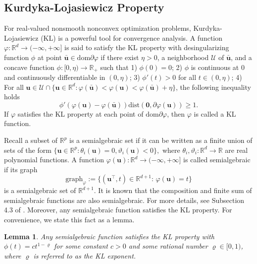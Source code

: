 \documentclass{article}
\newtheorem{lemma}[theorem]{Lemma}
\numberwithin{equation}{section}
\begin{document}
\subsection{Kurdyka-Lojasiewicz Property}
For real-valued nonsmooth nonconvex optimization problems, Kurdyka-Lojasiewicz (KL) is a powerful tool for convergence analysis. A function $\varphi: \mathbb{R}^d\to(-\infty, +\infty]$ is said to satisfy the KL property with desingularizing function $\phi$ at
point $\bar{\mathbf{u}}\in\mathrm{dom}\partial\varphi$ if there exist $\eta>0$, a neighborhood $\mathcal{U}$ of $\bar{\mathbf{u}}$,
and a concave function $\phi:[0,\eta)\to\mathbb{R}_{+}$ such that 1) $\phi(0)=0$; 2) $\phi$ is continuous at 0 and continuously differentiable in $(0, \eta)$; 3) $\phi'(t)>0$ for all $t\in(0, \eta)$; 4) For all $\mathbf{u}\in\mathcal{U}\cap\{\mathbf{u}\in\mathbb{R}^d: \varphi(\bar{\mathbf{u}})<\varphi(\mathbf{u})<
	\varphi(\bar{\mathbf{u}})+\eta\}$, the following inequality holds
	\[
	\phi'(\varphi(\mathbf{u})-\varphi(\bar{\mathbf{u}}))\mathrm{dist}(\mathbf{0}, \partial\varphi(\mathbf{u}))\geq 1.
	\]
If $\varphi$ satisfies the KL property at each point of $\mathrm{dom}\partial\varphi$, then $\varphi$ is called a KL function.


Recall a subset of $\mathbb{R}^p$ is a  semialgebraic set if it  can  be written as a finite union of sets of the form
$\{\mathbf{u}\in\mathbb{R}^p: \theta_i(\mathbf{u})=0, \vartheta_i(\mathbf{u})<0\},$
where $\theta_i, \vartheta_i: \mathbb{R}^d\to\mathbb{R}$ are real polynomial functions. A function $\varphi(\mathbf{u}): \mathbb{R}^d\to(-\infty, +\infty]$ is called  semialgebraic if its graph
$$\mathrm{graph}_{\varphi}:=\{(\mathbf{u}^\top, t)\in\mathbb{R}^{d+1}: \,\varphi(\mathbf{u})=t\}$$
is a semialgebraic set of $\mathbb{R}^{d+1}$. It is known that the composition and finite sum of semialgebraic functions are also semialgebraic. For more details, see Subsection 4.3 of \cite{attouch2010proximal}.
Moreover, any semialgebraic function satisfies the KL property. For convenience, we state this fact as a lemma.
  
\begin{lemma}\label{semialg-prop}
	Any semialgebraic function satisfies the KL property with $\phi(t) = ct^{1 - \varrho}$ for some constant $c > 0$ and some rational number $\varrho \in [0,1)$, where $\varrho$ is referred to as the KL exponent.
\end{lemma}
\end{document}
